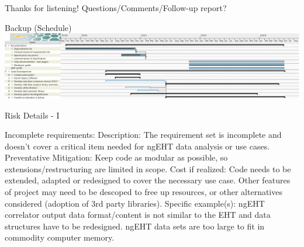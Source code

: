 \documentclass[8pt]{beamer}
\begin{document}
            


\begin{frame}{Thanks for listening!}
    \centering
    Questions/Comments/Follow-up report?
\end{frame}

\begin{frame}{Backup (Schedule)}
\centering
\includegraphics[width=\textwidth]{MSRI-HOPS-2021-3.png}
\end{frame}

\begin{frame}{Risk Details - I}
  
 \begin{outline}
        \1 Incomplete requirements:
            \2 Description: The requirement set is incomplete and doesn't cover a critical item needed for ngEHT data analysis or use cases.
            \2 Preventative Mitigation: Keep code as modular as possible, so extensions/restructuring are limited in scope.
            \2 Cost if realized: Code needs to be extended, adapted or redesigned to cover the necessary use case. Other features of project may need to be descoped to free up resources, or other alternatives considered (adoption of 3rd party libraries).
            \2 Specific example(s): 
            \3 ngEHT correlator output data format/content is not similar to the EHT and data structures have to be redesigned.
            \3 ngEHT data sets are too large to fit in commodity computer memory.
    \end{outline}
    
\end{frame}
\end{document}

